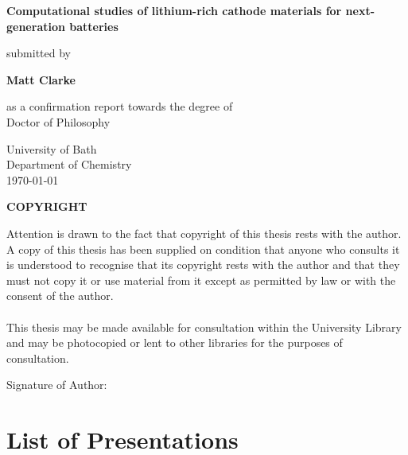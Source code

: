 \documentclass[12pt, oneside]{report}
\begin{document}
	
\setcounter{tocdepth}{1} 

\begin{titlepage}
\begin{center}
\vspace*{1cm}
 
\Large
\textbf{Computational studies of lithium-rich cathode materials for next-generation batteries}
       
\vspace{0.5cm}
\normalsize       
submitted by
       
      
\Large
\textbf{Matt Clarke}
 
\vspace{0.5cm}
\normalsize
as a confirmation report towards the degree of\\
Doctor of Philosophy
 
\vspace{0.5cm}
       
\LARGE
University of Bath\\
\normalsize
Department of Chemistry\\
       
\vspace{0.8cm}
\today
       
\vfill
\large
\textbf{COPYRIGHT}
\end{center}
Attention is drawn to the fact that copyright of this thesis rests with the author. A
copy of this thesis has been supplied on condition that anyone who consults it is
understood to recognise that its copyright rests with the author and that they must
not copy it or use material from it except as permitted by law or with the consent of
the author.
\\
\\
This thesis may be made available for consultation within the University Library and may be photocopied or lent to other libraries for the purposes of consultation.

\vspace{2cm}
\noindent Signature of Author: \dotfill
   
\end{titlepage}


\tableofcontents
\newpage
\chapter*{List of Presentations}
\newpage

\listoffigures

\newpage
{}







\renewcommand{\bibname}{References}


\newpage


\end{document}

